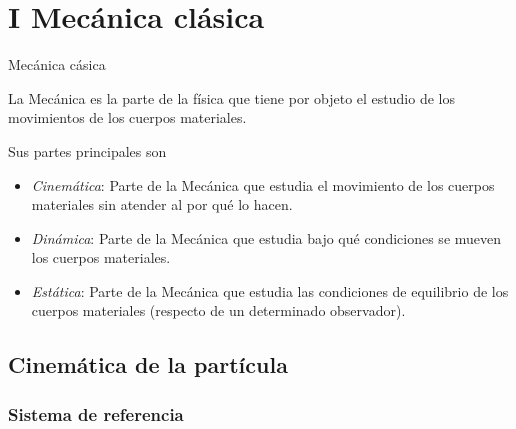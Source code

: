 \part{I Mecánica clásica}


\begin{myalertblock}{Mecánica cásica}

La Mecánica es la parte de la física que tiene por objeto el estudio de los movimientos de los cuerpos materiales.

Sus partes principales son

\begin{itemize}
\item \emph{Cinemática}: Parte de la Mecánica que estudia el movimiento de los cuerpos materiales sin atender al por qué lo hacen.
\item \emph{Dinámica}: Parte de la Mecánica	 que estudia bajo qué condiciones se mueven los cuerpos materiales.
\item \emph{Estática}:  Parte de la Mecánica que estudia las condiciones de equilibrio de los cuerpos materiales (respecto de un determinado observador).
\end{itemize}

\end{myalertblock}
 
\chapter{Cinemática de la partícula}


\setlength{\parindent}{0cm}


\section{Sistema de referencia}

